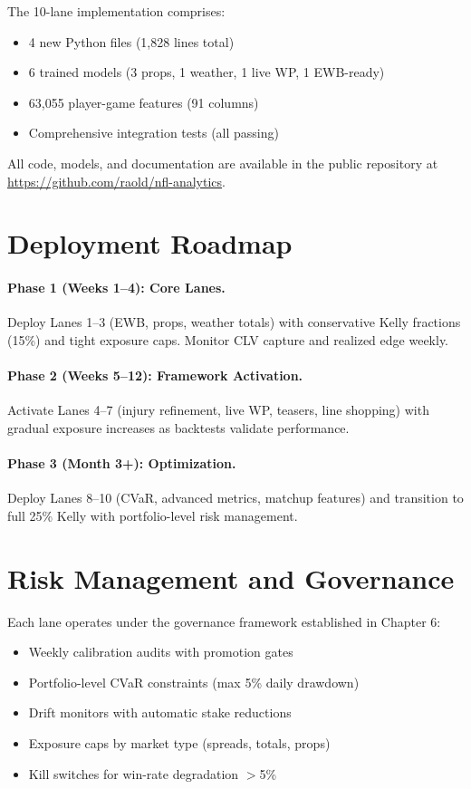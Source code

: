 The 10-lane implementation comprises:
\begin{itemize}
  \item 4 new Python files (1,828 lines total)
  \item 6 trained models (3 props, 1 weather, 1 live WP, 1 EWB-ready)
  \item 63,055 player-game features (91 columns)
  \item Comprehensive integration tests (all passing)
\end{itemize}

All code, models, and documentation are available in the public repository at \url{https://github.com/raold/nfl-analytics}.

\section{Deployment Roadmap}

\paragraph{Phase 1 (Weeks 1--4): Core Lanes.}
Deploy Lanes 1--3 (EWB, props, weather totals) with conservative Kelly fractions (15\%) and tight exposure caps. Monitor CLV capture and realized edge weekly.

\paragraph{Phase 2 (Weeks 5--12): Framework Activation.}
Activate Lanes 4--7 (injury refinement, live WP, teasers, line shopping) with gradual exposure increases as backtests validate performance.

\paragraph{Phase 3 (Month 3+): Optimization.}
Deploy Lanes 8--10 (CVaR, advanced metrics, matchup features) and transition to full 25\% Kelly with portfolio-level risk management.

\section{Risk Management and Governance}

Each lane operates under the governance framework established in Chapter 6:
\begin{itemize}
  \item Weekly calibration audits with promotion gates
  \item Portfolio-level CVaR constraints (max 5\% daily drawdown)
  \item Drift monitors with automatic stake reductions
  \item Exposure caps by market type (spreads, totals, props)
  \item Kill switches for win-rate degradation $>$5\%
\end{itemize}

